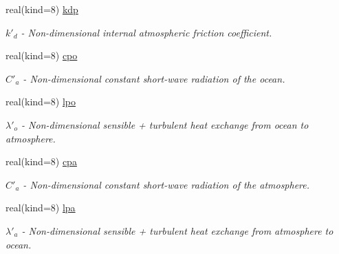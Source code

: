 \begin{DoxyCompactItemize}
\mbox{\label{structparams_1_1physicsconfiguration_ac5685b663021fc913b3d764988528246}} 
real(kind=8) \hyperlink{structparams_1_1physicsconfiguration_ac5685b663021fc913b3d764988528246}{kdp}
\begin{DoxyCompactList}\small\item\em $k'_d$ -\/ Non-\/dimensional internal atmospheric friction coefficient. \end{DoxyCompactList}\item 
\mbox{\label{structparams_1_1physicsconfiguration_a6a0e1298604a9ad1b28af8cbf538b9a4}} 
real(kind=8) \hyperlink{structparams_1_1physicsconfiguration_a6a0e1298604a9ad1b28af8cbf538b9a4}{cpo}
\begin{DoxyCompactList}\small\item\em $C'_a$ -\/ Non-\/dimensional constant short-\/wave radiation of the ocean. \end{DoxyCompactList}\item 
\mbox{\label{structparams_1_1physicsconfiguration_a4b50e9fa44e5b1d746947d4e1aaa4d8a}} 
real(kind=8) \hyperlink{structparams_1_1physicsconfiguration_a4b50e9fa44e5b1d746947d4e1aaa4d8a}{lpo}
\begin{DoxyCompactList}\small\item\em $\lambda'_o$ -\/ Non-\/dimensional sensible + turbulent heat exchange from ocean to atmosphere. \end{DoxyCompactList}\item 
real(kind=8) \hyperlink{structparams_1_1physicsconfiguration_ac6c4cb133d64bb6ba0091e07c15c2a19}{cpa}
\begin{DoxyCompactList}\small\item\em $C'_a$ -\/ Non-\/dimensional constant short-\/wave radiation of the atmosphere. \end{DoxyCompactList}\item 
\mbox{\label{structparams_1_1physicsconfiguration_a6bc2405687569edfc0f5650e63b65dd1}} 
real(kind=8) \hyperlink{structparams_1_1physicsconfiguration_a6bc2405687569edfc0f5650e63b65dd1}{lpa}
\begin{DoxyCompactList}\small\item\em $\lambda'_a$ -\/ Non-\/dimensional sensible + turbulent heat exchange from atmosphere to ocean. \end{DoxyCompactList}\item 

\end{DoxyCompactItemize}
